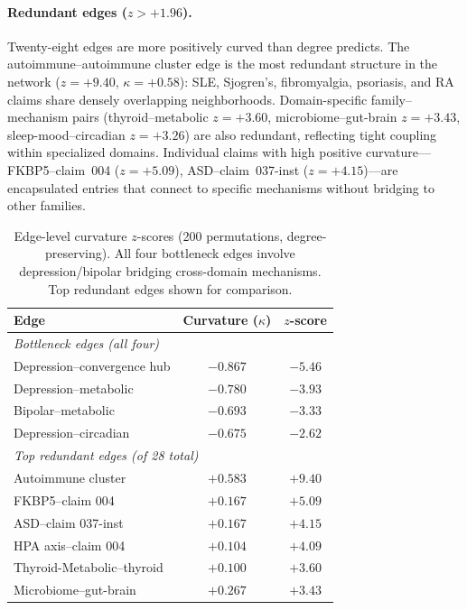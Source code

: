 \documentclass{article}
\begin{document}
\paragraph{Redundant edges ($z > +1.96$).} Twenty-eight edges are more positively curved than degree predicts. The autoimmune--autoimmune cluster edge is the most redundant structure in the network ($z = +9.40$, $\kappa = +0.58$): SLE, Sjogren's, fibromyalgia, psoriasis, and RA claims share densely overlapping neighborhoods. Domain-specific family--mechanism pairs (thyroid--metabolic $z = +3.60$, microbiome--gut-brain $z = +3.43$, sleep-mood--circadian $z = +3.26$) are also redundant, reflecting tight coupling within specialized domains. Individual claims with high positive curvature---FKBP5--claim~004 ($z = +5.09$), ASD--claim~037-inst ($z = +4.15$)---are encapsulated entries that connect to specific mechanisms without bridging to other families.

\begin{table}[t]
\centering
\caption{Edge-level curvature $z$-scores (200 permutations, degree-preserving). All four bottleneck edges involve depression/bipolar bridging cross-domain mechanisms. Top redundant edges shown for comparison.}
\label{tab:edge_null}
\begin{tabular}{lcc}
\toprule
Edge & Curvature ($\kappa$) & $z$-score \\
\midrule
\multicolumn{3}{l}{\emph{Bottleneck edges (all four)}} \\
Depression--convergence hub & $-0.867$ & $\mathbf{-5.46}$ \\
Depression--metabolic & $-0.780$ & $\mathbf{-3.93}$ \\
Bipolar--metabolic & $-0.693$ & $\mathbf{-3.33}$ \\
Depression--circadian & $-0.675$ & $-2.62$ \\
\midrule
\multicolumn{3}{l}{\emph{Top redundant edges (of 28 total)}} \\
Autoimmune cluster & $+0.583$ & $\mathbf{+9.40}$ \\
FKBP5--claim 004 & $+0.167$ & $\mathbf{+5.09}$ \\
ASD--claim 037-inst & $+0.167$ & $+4.15$ \\
HPA axis--claim 004 & $+0.104$ & $+4.09$ \\
Thyroid-Metabolic--thyroid & $+0.100$ & $+3.60$ \\
Microbiome--gut-brain & $+0.267$ & $+3.43$ \\
\bottomrule
\end{tabular}
\end{table}
\end{document}
